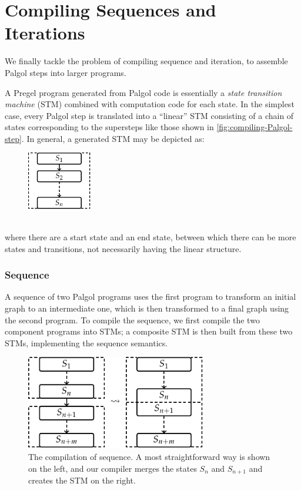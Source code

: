 \documentclass{sokendai_thesis} %
\begin{document}
\section{Compiling Sequences and Iterations}
\label{sec:trans-iter}

We finally tackle the problem of compiling sequence and iteration, to assemble Palgol steps into larger programs.

A Pregel program generated from Palgol code is essentially a \emph{state transition machine} (STM) combined with computation code for each state.
In the simplest case, every Palgol step is translated into a ``linear'' STM consisting of a chain of states corresponding to the supersteps like those shown in \autoref{fig:compiling-Palgol-step}.
In general, a generated STM may be depicted as:
\begin{figure}[h]
 \centering
 \includegraphics[width=0.25\textwidth]{figures/stm-general.pdf}
\end{figure}\\
where there are a start state and an end state, between which there can be more states and transitions, not necessarily having the linear structure.

\subsubsection{Sequence}

A sequence of two Palgol programs uses the first program to transform an initial graph to an intermediate one, which is then transformed to a final graph using the second program.
To compile the sequence, we first compile the two component programs into STMs; a composite STM is then built from these two STMs, implementing the sequence semantics.

\begin{figure}[t]
 \centering
 \includegraphics[width=0.7\textwidth]{figures/stm-seq.pdf}
 \caption{The compilation of sequence. A most straightforward way is shown on the left, and our compiler merges the states $S_n$ and $S_{n+1}$ and creates the STM on the right.}
 \label{fig:sequence}
\vspace{-2ex}\end{figure}
\end{document}
